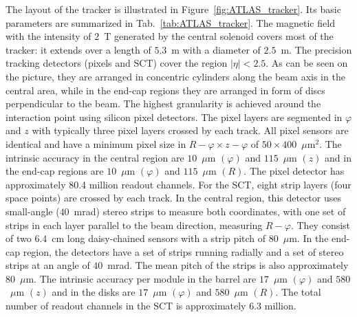 The layout of the tracker is illustrated in Figure~\ref{fig:ATLAS_tracker}. Its basic parameters are summarized in Tab.~\ref{tab:ATLAS_tracker}. The magnetic field with the intensity of $2$~T generated by the central solenoid covers most of the tracker: it extends over a length of $5.3$~m with a diameter of $2.5$~m. The precision tracking detectors (pixels and SCT) cover the region $|\eta|<2.5$. As can be seen on the picture, they are arranged in concentric cylinders along the beam axis in the central area, while in the end-cap regions they are arranged in form of discs perpendicular to the beam. The highest granularity is achieved around the interaction point using silicon pixel detectors. The pixel layers are
segmented in $\varphi$ and $z$ with typically three pixel layers crossed by each track. All pixel sensors
are identical and have a minimum pixel size in $R-\varphi \times z-\varphi$ of $50 \times 400$~$\mu$m$^2$. The intrinsic accuracy
in the central region are $10$~$\mu$m $(\varphi)$ and $115$~$\mu$m $(z)$ and in the end-cap regions are $10$~$\mu$m $(\varphi)$ and $115$~$\mu$m $(R)$.
The pixel detector has approximately 80.4 million readout channels. For the SCT, eight strip layers
(four space points) are crossed by each track. In the central region, this detector uses small-angle
($40$~mrad) stereo strips to measure both coordinates, with one set of strips in each layer parallel to
the beam direction, measuring $R-\varphi$. They consist of two $6.4$~cm long daisy-chained sensors with
a strip pitch of $80$~$\mu$m. In the end-cap region, the detectors have a set of strips running radially and
a set of stereo strips at an angle of $40$~mrad. The mean pitch of the strips is also approximately
$80$~$\mu$m. The intrinsic accuracy per module in the barrel are $17$~$\mu$m $(\varphi)$ and $580$~$\mu$m $(z)$ and in
the disks are $17$~$\mu$m $(\varphi)$ and $580$~$\mu$m $(R)$. The total number of readout channels in the SCT is
approximately 6.3 million.

